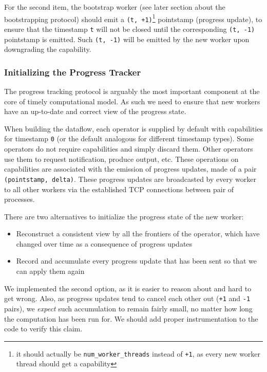 \documentclass[12pt]{extarticle}
\begin{document}
\vspace{3mm}
For the second item, the bootstrap worker (see later section about the bootstrapping protocol)
should emit a \verb|(t, +1)|\footnote{it should actually be \verb|num_worker_threads| instead of \verb|+1|, as every new worker thread should get a capability}
pointstamp (progress update), to ensure that the timestamp \verb|t| will not be closed
until the corresponding \verb|(t, -1)| pointstamp is emitted.
Such \verb|(t, -1)| will be emitted by the new worker upon downgrading the capability.

\subsubsection{Initializing the Progress Tracker}
The progress tracking protocol is arguably the most important component at the core of timely computational model.
As such we need to ensure that new workers have an up-to-date and correct view of the progress state.

When building the dataflow, each operator is supplied by default with capabilities for timestamp \verb|0| (or the default analogous for different
timestamp types). Some operators do not require capabilities and simply discard them. Other operators use them to request notification,
produce output, etc.
These operations on capabilities are associated with the emission of progress updates, made of a pair \verb|(pointstamp, delta)|.
These progress updates are broadcasted by every worker to all other workers via the established TCP connections between pair of processes.

There are two alternatives to initialize the progress state of the new worker:
\begin{itemize}
    \item Reconstruct a consistent view by all the frontiers of the operator, which have changed over time as a consequence of progress updates
    \item Record and accumulate every progress update that has been sent so that we can apply them again
\end{itemize}

We implemented the second option, as it is easier to reason about and hard to get wrong. Also,
as progress updates tend to cancel each other out (\verb|+1| and \verb|-1| pairs), we \textit{expect}
such accumulation to remain fairly small, no matter how long the computation has been run for.
We should add proper instrumentation to the code to verify this claim.
\end{document}
